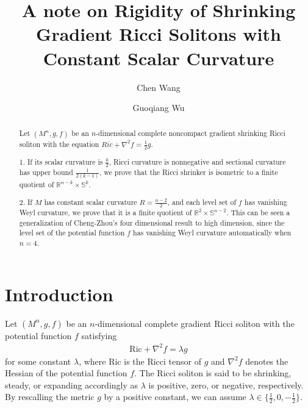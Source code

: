 \documentclass[12pt]{amsart}
\begin{document}
	\newtheorem{defn}[theo]{Definition}
	\newtheorem{ques}[theo]{Question}
	\newtheorem{lem}[theo]{Lemma}
	\newtheorem{prop}[theo]{Proposition}
	\newtheorem{coro}[theo]{Corollary}
	\newtheorem{ex}[theo]{Example}
	\newtheorem{note}[theo]{Note}
	\newtheorem{conj}[theo]{Conjecture}
	\makeatletter
	\makeatother
	
	
	\title[Ricci Shrinker with Constant scalar curvature]{A note on Rigidity of  Shrinking Gradient Ricci Solitons with Constant Scalar Curvature}
	\author{Chen Wang}
	\address[Chen Wang]
	{School of Science, Zhejiang Sci-Tech University, Hangzhou 310018, China}
	
	
	\author{Guoqiang Wu}
	\address[Guoqiang Wu]
	{School of Science, Zhejiang Sci-Tech University, Hangzhou 310018, China}
	
	
	
	
	\date{}
	\maketitle
	
	
	\begin{abstract} Let $(M^n, g, f)$ be an $n$-dimensional complete noncompact gradient shrinking Ricci soliton with the equation $Ric+\nabla^2f= \frac{1}{2}g$.

 1. If its scalar curvature is $\frac{k}{2}$, Ricci curvature is nonnegative and sectional curvature has upper bound $\frac{1}{2(k-1)}$, we prove that the Ricci shrinker is isometric to a finite quotient of $\mathbb{R}^{n-k}\times \mathbb{S}^k$.

 2. If $M$ has constant scalar curvature $R=\frac{n-2}{2}$, and  each level set of $f$ has vanishing Weyl curvature, we prove that it is a finite quotient of $\mathbb{R}^2\times \mathbb{S}^{n-2}$. This can be seen a generalization of Cheng-Zhou's four dimensional  result  \cite{Cheng-Zhou} to high dimension, since the level set of the potential function $f$ has vanishing Weyl curvature automatically when $n=4$.
	\end{abstract}
	
	\section{Introduction}
	Let  $(M^n, g, f)$ be an $n$-dimensional complete gradient Ricci soliton with the potential function $f$ satisfying
	\begin{align}\label{soliton}
	\text{Ric}+\nabla^2f=\lambda g
	\end{align}
	for some constant $\lambda$, where $\text{Ric}$ is the Ricci tensor of $g$ and $\nabla^2f$ denotes the Hessian of the potential function $f$.
	The Ricci soliton is said to be shrinking, steady, or expanding accordingly as $\lambda$ is positive, zero, or negative, respectively. By rescalling the metric $g$ by a positive constant, we can assume $\lambda\in \{\frac{1}{2}, 0, -\frac{1}{2}\}$.
	\smallskip	
	
\end{document}
